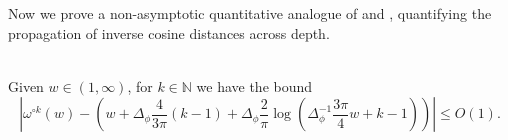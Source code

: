 \documentclass[twoside,11pt]{article}
\newcommand{\N}{\mathbb{N}}
\begin{document}
Now we prove a non-asymptotic quantitative analogue of \citet[Proposition~1]{Hayouetal2019} and \citet[Theorem~1]{Hayouetal2022}, quantifying the propagation of inverse cosine distances across depth.

\begin{proposition}\label{prop:inverse_cosine_distance_propagation}~\\
Given $w \in (1,\infty)$, for $k \in \N$ we have the bound
\begin{equation}\label{eq:w_j_bound}
\left\vert \omega^{\circ k}(w) - \left( w + \Delta_\phi \frac{4}{3\pi} (k-1) + \Delta_\phi \frac{2}{\pi} \log\left( \Delta_\phi^{-1} \frac{3\pi}{4} w + k - 1 \right) \right) \right\vert \leq O(1).
\end{equation}
\end{proposition}
\end{document}
